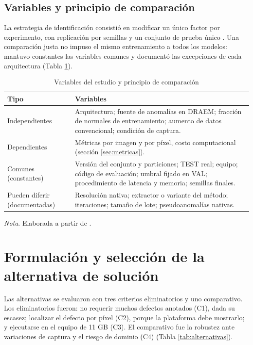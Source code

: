 \documentclass[12pt,oneside]{report}
\newcommand{\nota}[1]{\par\noindent\textit{Nota}. #1\par}
\begin{document}
\subsection{Variables y principio de comparación}

La estrategia de identificación consistió en modificar un único factor por experimento, con replicación por semillas y un conjunto de prueba único \cite{montgomery2017}. Una comparación justa no impuso el mismo entrenamiento a todos los modelos: mantuvo constantes las variables comunes y documentó las excepciones de cada arquitectura \cite{paez2026} (Tabla \ref{tab:variables}).

\begin{table}[H]
\singlespacing\setlength{\parindent}{0pt}\setlength{\RaggedRightParindent}{0pt}
\caption{Variables del estudio y principio de comparación}
\label{tab:variables}
\begin{tabularx}{\textwidth}{@{}>{\RaggedRight\arraybackslash}p{3.6cm}>{\RaggedRight\arraybackslash}X@{}}
\toprule
Tipo & Variables \\
\midrule
Independientes & Arquitectura; fuente de anomalías en DRAEM; fracción de normales de entrenamiento; aumento de datos convencional; condición de captura. \\
Dependientes & Métricas por imagen y por píxel, costo computacional (sección \ref{sec:metricas}). \\
Comunes (constantes) & Versión del conjunto y particiones; TEST real; equipo; código de evaluación; umbral fijado en VAL; procedimiento de latencia y memoria; semillas finales. \\
Pueden diferir (documentadas) & Resolución nativa; extractor o variante del método; iteraciones; tamaño de lote; pseudoanomalías nativas. \\
\bottomrule
\end{tabularx}
\nota{Elaborada a partir de \cite{paez2026}.}
\end{table}

\section{Formulación y selección de la alternativa de solución}

Las alternativas se evaluaron con tres criterios eliminatorios y uno comparativo. Los eliminatorios fueron: no requerir muchos defectos anotados (C1), dada su escasez; localizar el defecto por píxel (C2), porque la plataforma debe mostrarlo; y ejecutarse en el equipo de 11 GB (C3). El comparativo fue la robustez ante variaciones de captura y el riesgo de dominio (C4) (Tabla \ref{tab:alternativas}).
\end{document}
